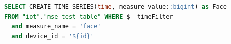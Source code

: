 \begin{lstlisting}[language=SQL, label=cod:grafana_sql,caption=Código SQL para obtener datos de Tiemstream en Grafana.]
SELECT CREATE_TIME_SERIES(time, measure_value::bigint) as Face
FROM "iot"."mse_test_table" WHERE $__timeFilter
  and measure_name = 'face'
  and device_id = '${id}'
\end{lstlisting}
